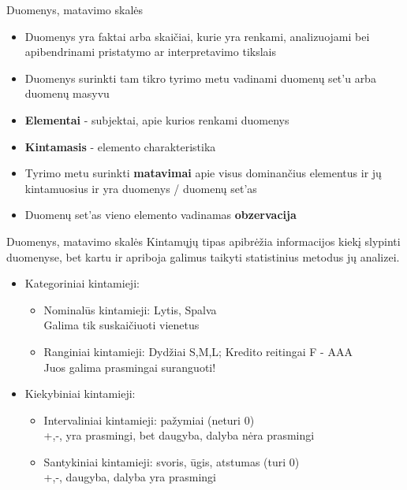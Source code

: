 \documentclass[11pt,xcolor=table]{beamer}
\begin{document}
\begin{frame}{Duomenys, matavimo skalės}
\begin{itemize}
\item Duomenys yra faktai arba skaičiai, kurie yra renkami, analizuojami bei apibendrinami pristatymo ar interpretavimo tikslais
\item Duomenys surinkti tam tikro tyrimo metu vadinami duomenų set'u arba duomenų masyvu
\item \textbf{Elementai} - subjektai, apie kurios renkami duomenys
\item \textbf{Kintamasis} - elemento charakteristika
\item Tyrimo metu surinkti \textbf{matavimai} apie visus dominančius elementus ir jų kintamuosius ir yra duomenys / duomenų set'as
\item Duomenų set'as vieno elemento vadinamas \textbf{obzervacija}
\end{itemize}
\end{frame}


\begin{frame}{Duomenys, matavimo skalės}
Kintamųjų tipas apibrėžia informacijos kiekį slypinti duomenyse, bet kartu ir apriboja galimus taikyti statistinius metodus jų analizei.
\begin{itemize}
\item Kategoriniai kintamieji:
\begin{itemize}
\item Nominalūs kintamieji: Lytis, Spalva
\\ Galima tik suskaičiuoti vienetus
\item Ranginiai kintamieji: Dydžiai S,M,L; Kredito reitingai F - AAA 
\\ Juos galima prasmingai suranguoti!
\end{itemize}
\item Kiekybiniai kintamieji:
\begin{itemize}
\item Intervaliniai kintamieji: pažymiai (neturi 0)
\\ +,-, yra prasmingi, bet daugyba, dalyba nėra prasmingi
\item Santykiniai kintamieji: svoris, ūgis, atstumas  (turi 0)
\\ +,-, daugyba, dalyba yra prasmingi
\end{itemize}
\end{itemize}
\end{frame}
\end{document}
